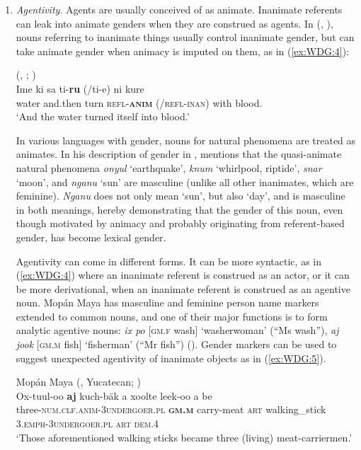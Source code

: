 \documentclass[output=collectionpaper]{langsci/langscibook}
\begin{document}
\begin{enumerate}[label=(\roman*)]
\item \textit{Agentivity}. Agents are usually conceived of as animate. Inanimate referents can leak into animate genders when they are construed as agents. In  (, ), nouns referring to inanimate things usually control inanimate gender, but can take animate gender when animacy is imputed on them, as in (\ref{ex:WDG:4}):

\ea\label{ex:WDG:4}
 (, ; \citealt[32]{Gore1926})\\
\gll Ime	ki	sa	ti-\textbf{ru}	(/ti-e)	ni	kure\\
 water	and.then	turn	\textsc{refl-\textbf{anim}}	(/\textsc{refl-inan})	with	blood.\\
\glt `And the water turned itself into blood.'\\
\z

In various languages with gender, nouns for natural phenomena are treated as animates. In his description of gender in ,  mentions that the quasi-animate natural phenomena \textit{onyul} `earthquake', \textit{knum} `whirlpool, riptide', \textit{snar} `moon', and \textit{nganu} `sun' are masculine (unlike all other inanimates, which are feminine). \textit{Nganu} does not only mean `sun', but also `day', and is masculine in both meanings, hereby demonstrating that the gender of this noun, even though motivated by animacy and probably originating from referent-based gender, has become lexical gender.

Agentivity can come in different forms. It can be more syntactic, as in (\ref{ex:WDG:4}) where an inanimate referent is construed as an actor, or it can be more derivational, when an inanimate referent is construed as an agentive noun. Mopán Maya has masculine and feminine person name markers extended to common nouns, and one of their major functions is to form analytic agentive nouns: \textit{ix p\textquotesingle{}o\textquotesingle{}} [\textsc{gm.f} wash] `washerwoman' (``Ms wash''), \textit{aj jook\textquotesingle{}} [\textsc{gm.m} fish] `fisherman' (``Mr fish'') (\citealt[140]{Contini-Morava2018}). Gender markers can be used to suggest unexpected agentivity of inanimate objects as in (\ref{ex:WDG:5}).

\ea\label{ex:WDG:5}
Mopán Maya (, Yucatecan; \citealt[141]{Contini-Morava2018})\\
\gll Ox-tuul-oo\textquotesingle{}	\textbf{aj}	kuch-b\textquotesingle{}äk\textquotesingle{} a	xoolte\textquotesingle{}	leek-oo\textquotesingle{}	a	b\textquotesingle{}e\textquotesingle{}\\
three-\textsc{num.clf.anim-3undergoer.pl}	\textbf{\textsc{gm.m}}	carry-meat \textsc{art}	walking\_stick	\textsc{3.emph-3undergoer.pl}	\textsc{art}	\textsc{dem.4}\\
\glt `Those aforementioned walking sticks became three (living) meat-carriermen.'\\
\z


\end{enumerate}
\end{document}
